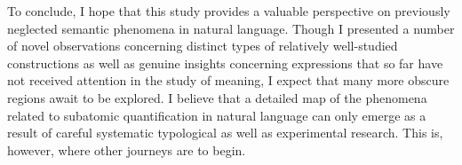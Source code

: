 To conclude, I hope that this study provides a valuable perspective on previously neglected semantic phenomena in natural language. Though I presented a number of novel observations concerning distinct types of relatively well-studied constructions as well as genuine insights concerning expressions that so far have not received attention in the study of meaning, I expect that many more obscure regions await to be explored. I believe that a detailed map of the phenomena related to subatomic quantification in natural language can only emerge as a result of careful systematic typological as well as experimental research. This is, however, where other journeys are to begin.
